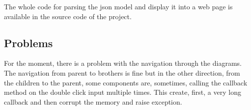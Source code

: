 The whole code for parsing the json model and display it into a web page is
available in the source code of the project.

\subsection{Problems}
\label{sec:problems}

For the moment, there is a problem with the navigation through the diagrams. The
navigation from parent to brothers is fine but in the other direction, from the
children to the parent, some components are, sometimes, calling the callback
method on the double click input multiple times. This create, first, a very long
callback and then corrupt the memory and raise exception.

